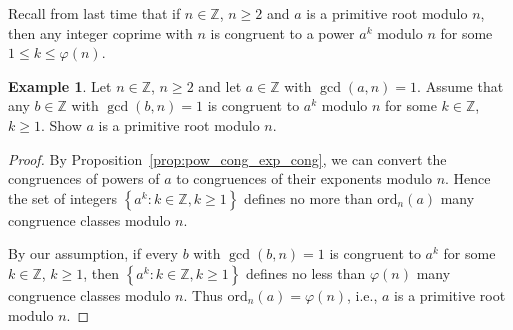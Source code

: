 \documentclass{amsbook}
\theoremstyle{plain}
\theoremstyle{definition}
\newtheorem{example}[theorem]{Example}
\theoremstyle{remark}
\numberwithin{equation}{chapter}
\numberwithin{figure}{chapter}
\newcommand{\Z}{\mathbb{Z}}
\newcommand*{\ord}{\text{ord}}
\begin{document}
Recall from last time that if $n \in \Z$, $n \geqslant 2$ and $a$ is a primitive root modulo $n$, then any integer coprime with $n$ is congruent to a power $a^k$ modulo $n$ for some $1 \leqslant k \leqslant \varphi (n)$.
\begin{example}\label{ex:ex1_day30}
  Let $n \in \Z$, $n \geqslant 2$ and let $a \in \Z$ with $\gcd (a, n) = 1$. Assume that any $b \in \Z$ with $\gcd (b, n) = 1$ is congruent to $a^k$ modulo $n$ for some $k \in \Z$, $k \geqslant 1$. Show $a$ is a primitive root modulo $n$.
\end{example}
\begin{proof}
  By Proposition~\ref{prop:pow_cong_exp_cong}, we can convert the congruences of powers of $a$ to congruences of their exponents modulo $n$. Hence the set of integers $\left\{ a^k : k \in \Z, k \geqslant 1 \right\}$ defines no more than $\ord_n (a)$ many congruence classes modulo $n$.

  By our assumption, if every $b$ with $\gcd (b, n) = 1$ is congruent to $a^k$ for some $k \in \Z$, $k \geqslant 1$, then $\left\{ a^k : k \in \Z, k \geqslant 1 \right\}$ defines no less than $\varphi (n)$ many congruence classes modulo $n$. Thus $\ord_n (a) = \varphi (n)$, i.e., $a$ is a primitive root modulo $n$.
\end{proof}
\end{document}
